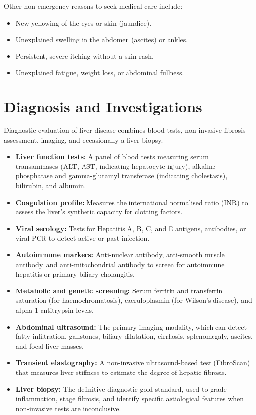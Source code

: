 Other non-emergency reasons to seek medical care include:
\begin{itemize}
    \item New yellowing of the eyes or skin (jaundice).
    \item Unexplained swelling in the abdomen (ascites) or ankles.
    \item Persistent, severe itching without a skin rash.
    \item Unexplained fatigue, weight loss, or abdominal fullness.
\end{itemize}

\section*{Diagnosis and Investigations}
Diagnostic evaluation of liver disease combines blood tests, non-invasive fibrosis assessment, imaging, and occasionally a liver biopsy.
\begin{itemize}
    \item \textbf{Liver function tests:} A panel of blood tests measuring serum transaminases (ALT, AST, indicating hepatocyte injury), alkaline phosphatase and gamma-glutamyl transferase (indicating cholestasis), bilirubin, and albumin.
    \item \textbf{Coagulation profile:} Measures the international normalised ratio (INR) to assess the liver's synthetic capacity for clotting factors.
    \item \textbf{Viral serology:} Tests for Hepatitis A, B, C, and E antigens, antibodies, or viral PCR to detect active or past infection.
    \item \textbf{Autoimmune markers:} Anti-nuclear antibody, anti-smooth muscle antibody, and anti-mitochondrial antibody to screen for autoimmune hepatitis or primary biliary cholangitis.
    \item \textbf{Metabolic and genetic screening:} Serum ferritin and transferrin saturation (for haemochromatosis), caeruloplasmin (for Wilson's disease), and alpha-1 antitrypsin levels.
    \item \textbf{Abdominal ultrasound:} The primary imaging modality, which can detect fatty infiltration, gallstones, biliary dilatation, cirrhosis, splenomegaly, ascites, and focal liver masses.
    \item \textbf{Transient elastography:} A non-invasive ultrasound-based test (FibroScan) that measures liver stiffness to estimate the degree of hepatic fibrosis.
    \item \textbf{Liver biopsy:} The definitive diagnostic gold standard, used to grade inflammation, stage fibrosis, and identify specific aetiological features when non-invasive tests are inconclusive.
\end{itemize}

